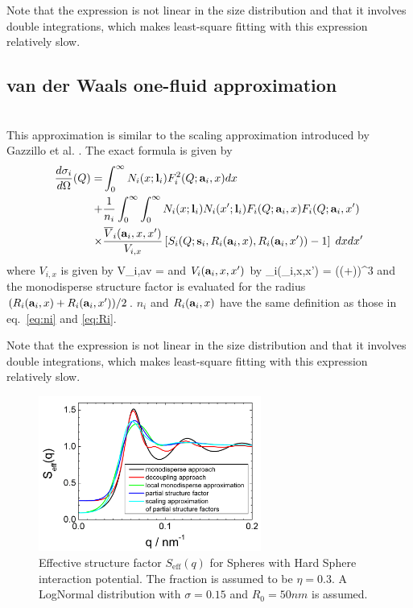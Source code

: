 Note that the expression is not linear in the size distribution
and that it involves double integrations, which makes least-square
fitting with this expression relatively slow.

\subsection{van der Waals one-fluid approximation}
\label{sec:SQvdW1}
~\\
This approximation is similar to the scaling approximation introduced by Gazzillo
et al. \cite{Gazzillo1999}. The exact formula is given by
\begin{align}
\frac{d\sigma_i}{d\Omega}(Q) =
 &\int_0^\infty N_i(x;\B{l}_i) F_i^2(Q;\B{a}_i,x) dx \\
+ & \frac{1}{n_i}\int_0^\infty\int_0^\infty
N_i(x;\B{l}_i) N_i(x';\B{l}_i) F_i(Q;\B{a}_i,x) F_i(Q;\B{a}_i,x') \nonumber \\
\times & \frac{\overline{V}_i(\B{a}_i,x,x')}{V_{i,x}}
\left[S_i(Q;\B{s}_i,R_i(\B{a}_i,x),R_i(\B{a}_i,x'))-1\right] \;dx
dx' \nonumber
\end{align}
where $V_{i,x}$ is given by
\BE
V_{i,av} = 
\EE
and $V_i(\B{a}_i,x,x')$ by
\BE
{}_i(_i,x,x') = \pi \left(\left(+\right)\right)^3
\EE
and the monodisperse structure factor is evaluated for the radius
$(R_i(\B{a}_i,x)+R_i(\B{a}_i,x'))/2$. $n_i$ and $R_i(\B{a}_i,x)$ have the same
definition as those in eq.\ \ref{eq:ni} and \ref{eq:Ri}.

Note that the expression is not linear in the size distribution
and that it involves double integrations, which makes least-square
fitting with this expression relatively slow.



\begin{figure}[htb]
\begin{center}
\includegraphics[width=0.65\textwidth]{../images/structure_factor/Seff.png}
\end{center}
\caption{Effective structure factor $S_\text{eff}(q)$ for Spheres with Hard Sphere interaction potential.
The fraction is assumed to be $\eta=0.3$. A LogNormal distribution with $\sigma=0.15$ and $R_0=50nm$
is assumed.}
\label{fig:Seff}
\end{figure}

